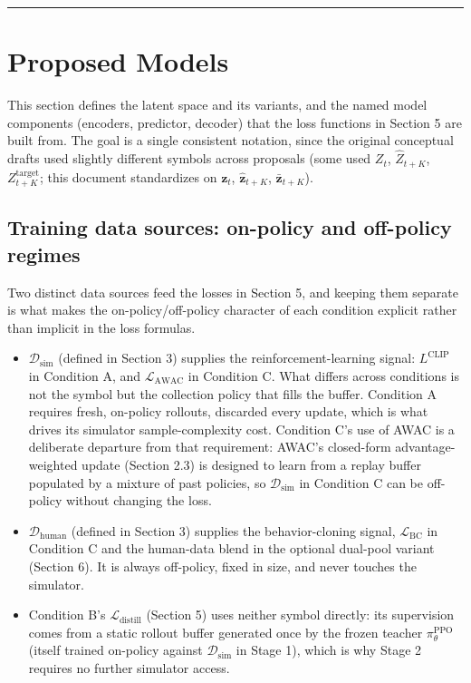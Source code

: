 \documentclass[11pt]{article}
\providecommand{\tightlist}{%
  \setlength{\itemsep}{0pt}\setlength{\parskip}{0pt}}
\begin{document}
\begin{center}\rule{0.5\linewidth}{0.5pt}\end{center}

\hypertarget{proposed-models}{%
\section{Proposed Models}\label{proposed-models}}

This section defines the latent space and its variants, and the named model components (encoders, predictor, decoder) that the loss functions in Section 5 are built from. The goal is a single consistent notation, since the original conceptual drafts used slightly different symbols across proposals (some used \(Z_t\), \(\hat{Z}_{t+K}\), \(Z_{t+K}^{\text{target}}\); this document standardizes on \(\mathbf{z}_t\), \(\hat{\mathbf{z}}_{t+K}\), \(\bar{\mathbf{z}}_{t+K}\)).

\hypertarget{training-data-sources-on-policy-and-off-policy-regimes}{%
\subsection{Training data sources: on-policy and off-policy regimes}\label{training-data-sources-on-policy-and-off-policy-regimes}}

Two distinct data sources feed the losses in Section 5, and keeping them separate is what makes the on-policy/off-policy character of each condition explicit rather than implicit in the loss formulas.

\begin{itemize}
\tightlist
\item
  \(\mathcal{D}_{\text{sim}}\) (defined in Section 3) supplies the reinforcement-learning signal: \(L^{\text{CLIP}}\) in Condition A, and \(\mathcal{L}_{\text{AWAC}}\) in Condition C. What differs across conditions is not the symbol but the collection policy that fills the buffer. Condition A requires fresh, on-policy rollouts, discarded every update, which is what drives its simulator sample-complexity cost. Condition C's use of AWAC is a deliberate departure from that requirement: AWAC's closed-form advantage-weighted update (Section 2.3) is designed to learn from a replay buffer populated by a mixture of past policies, so \(\mathcal{D}_{\text{sim}}\) in Condition C can be off-policy without changing the loss.
\item
  \(\mathcal{D}_{\text{human}}\) (defined in Section 3) supplies the behavior-cloning signal, \(\mathcal{L}_{\text{BC}}\) in Condition C and the human-data blend in the optional dual-pool variant (Section 6). It is always off-policy, fixed in size, and never touches the simulator.
\item
  Condition B's \(\mathcal{L}_{\text{distill}}\) (Section 5) uses neither symbol directly: its supervision comes from a static rollout buffer generated once by the frozen teacher \(\pi_\theta^{\text{PPO}}\) (itself trained on-policy against \(\mathcal{D}_{\text{sim}}\) in Stage 1), which is why Stage 2 requires no further simulator access.
\end{itemize}
\end{document}
